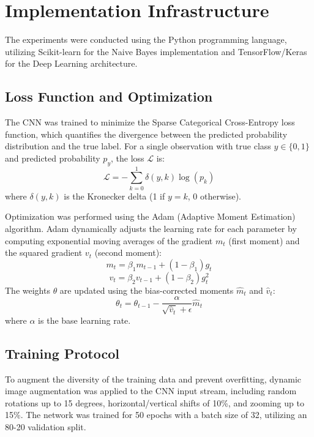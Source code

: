 \documentclass[conference]{IEEEtran}
\begin{document}
\section{Implementation Infrastructure}
The experiments were conducted using the Python programming language, utilizing Scikit-learn for the Naive Bayes implementation and TensorFlow/Keras for the Deep Learning architecture. 

\subsection{Loss Function and Optimization}
The CNN was trained to minimize the Sparse Categorical Cross-Entropy loss function, which quantifies the divergence between the predicted probability distribution and the true label. For a single observation with true class $y \in \{0, 1\}$ and predicted probability $p_y$, the loss $\mathcal{L}$ is:
\begin{equation}
    \mathcal{L} = - \sum_{k=0}^{1} \delta(y, k) \log(p_k)
\end{equation}
where $\delta(y, k)$ is the Kronecker delta (1 if $y=k$, 0 otherwise).

Optimization was performed using the Adam (Adaptive Moment Estimation) algorithm. Adam dynamically adjusts the learning rate for each parameter by computing exponential moving averages of the gradient $m_t$ (first moment) and the squared gradient $v_t$ (second moment):
\begin{equation}
    m_t = \beta_1 m_{t-1} + (1 - \beta_1) g_t
\end{equation}
\begin{equation}
    v_t = \beta_2 v_{t-1} + (1 - \beta_2) g_t^2
\end{equation}
The weights $\theta$ are updated using the bias-corrected moments $\hat{m}_t$ and $\hat{v}_t$:
\begin{equation}
    \theta_t = \theta_{t-1} - \frac{\alpha}{\sqrt{\hat{v}_t} + \epsilon} \hat{m}_t
\end{equation}
where $\alpha$ is the base learning rate. 

\subsection{Training Protocol}
To augment the diversity of the training data and prevent overfitting, dynamic image augmentation was applied to the CNN input stream, including random rotations up to 15 degrees, horizontal/vertical shifts of 10\%, and zooming up to 15\%. The network was trained for 50 epochs with a batch size of 32, utilizing an 80-20 validation split.
\end{document}
